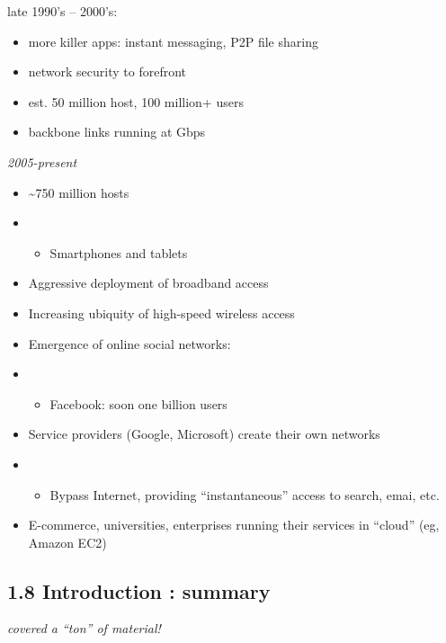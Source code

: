 \documentclass[
]{article}
\begin{document}
late 1990's -- 2000's:

\begin{itemize}
\item
  more killer apps: instant messaging, P2P file sharing
\item
  network security to forefront
\item
  est. 50 million host, 100 million+ users
\item
  backbone links running at Gbps
\end{itemize}

\emph{2005-present}

\begin{itemize}
\item
  \textasciitilde750 million hosts
\item
  \begin{itemize}
  \item
    Smartphones and tablets
  \end{itemize}
\item
  Aggressive deployment of broadband access
\item
  Increasing ubiquity of high-speed wireless access
\item
  Emergence of online social networks:
\item
  \begin{itemize}
  \item
    Facebook: soon one billion users
  \end{itemize}
\item
  Service providers (Google, Microsoft) create their own networks
\item
  \begin{itemize}
  \item
    Bypass Internet, providing ``instantaneous'' access to search, emai,
    etc.
  \end{itemize}
\item
  E-commerce, universities, enterprises running their services in
  ``cloud'' (eg, Amazon EC2)
\end{itemize}

\hypertarget{18-introduction--summary}{%
\subsection{1.8 Introduction : summary}\label{18-introduction--summary}}

\emph{covered a ``ton'' of material!}
\end{document}
